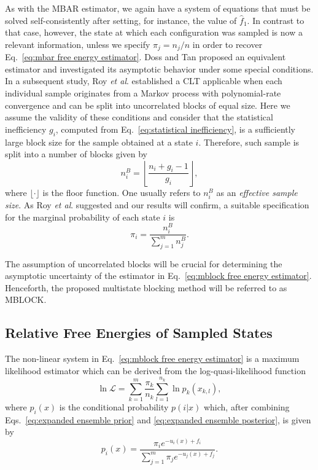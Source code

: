 \documentclass[aip,jcp,reprint,amsmath,amssymb]{revtex4-1}
\begin{document}
As with the MBAR estimator, we again have a system of equations that must be solved self-consistently after setting, for instance, the value of $\hat f_1$. In contrast to that case, however, the state at which each configuration was sampled is now a relevant information, unless we specify $\pi_j = {n_j}/{n}$ in order to recover Eq.~\eqref{eq:mbar free energy estimator}. Doss and Tan\cite{Doss_2014} proposed an equivalent estimator and investigated its asymptotic behavior under some special conditions. In a subsequent study, Roy \textit{et al}.\cite{Roy_2018} established a CLT applicable when each individual sample originates from a Markov process with polynomial-rate convergence and can be split into uncorrelated blocks of equal size. Here we assume the validity of these conditions and consider that the statistical inefficiency $g_i$, computed from Eq.~\eqref{eq:statistical inefficiency}, is a sufficiently large block size for the sample obtained at a state $i$. Therefore, such sample is split into a number of blocks given by
\begin{equation*}
\label{eq:mblock number of blocks}
n^B_i = \left\lfloor \frac{n_i + g_i - 1}{g_i} \right\rfloor,
\end{equation*}
where $\lfloor \cdot \rfloor$ is the floor function. One usually refers to $n^B_i$ as an \textit{effective sample size}. As Roy \textit{et al}.\cite{Roy_2018} suggested and our results will confirm, a suitable specification for the marginal probability of each state $i$ is
\begin{equation}
\label{eq:mblock prior}
\pi_i = \frac{n^B_i}{\sum_{j=1}^m n^B_j}.
\end{equation}

The assumption of uncorrelated blocks will be crucial for determining the asymptotic uncertainty of the estimator in Eq.~\eqref{eq:mblock free energy estimator}. Henceforth, the proposed multistate blocking method will be referred to as MBLOCK.

\subsection{Relative Free Energies of Sampled States}

The non-linear system in Eq.~\eqref{eq:mblock free energy estimator} is a maximum likelihood estimator which can be derived from the log-quasi-likelihood function\cite{Doss_2014, Tan_2015, Roy_2018}
\begin{equation}
\label{eq:gmbar log quasi-likelihood}
\ln \mathcal L = \sum_{k=1}^m \frac{\pi_k}{n_k} \sum_{l=1}^{n_k} \ln p_k(x_{k,l}),
\end{equation}
where $p_i(x)$ is the conditional probability $p(i|x)$ which, after combining Eqs.~\eqref{eq:expanded ensemble prior} and \eqref{eq:expanded ensemble posterior}, is given by
\begin{equation}
\label{eq:mixture posterior probability}
p_i(x) = \frac{\pi_i e^{-u_i(x) + f_i}}{\sum_{j=1}^m \pi_j e^{-u_j(x) + f_j}}.
\end{equation}
\end{document}
